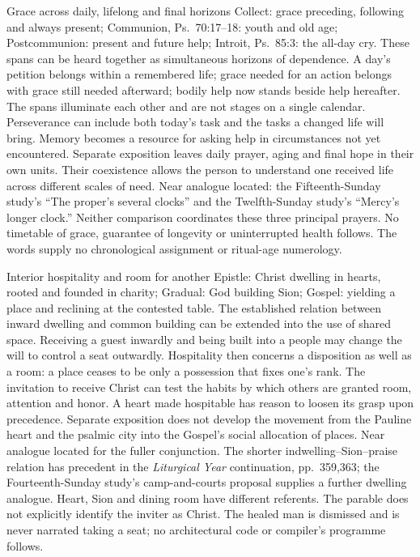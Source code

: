 \begin{proposal}{Grace across daily, lifelong and final horizons}
 Collect: grace preceding, following and always present; Communion, Ps.~70:17--18: youth and old age; Postcommunion: present and future help; Introit, Ps.~85:3: the all-day cry.
 These spans can be heard together as simultaneous horizons of dependence. A day's petition belongs within a remembered life; grace needed for an action belongs with grace still needed afterward; bodily help now stands beside help hereafter. The spans illuminate each other and are not stages on a single calendar.
 Perseverance can include both today's task and the tasks a changed life will bring. Memory becomes a resource for asking help in circumstances not yet encountered.
 Separate exposition leaves daily prayer, aging and final hope in their own units. Their coexistence allows the person to understand one received life across different scales of need.
 Near analogue located: the Fifteenth-Sunday study's ``The proper's several clocks'' and the Twelfth-Sunday study's ``Mercy's longer clock.'' Neither comparison coordinates these three principal prayers.
 No timetable of grace, guarantee of longevity or uninterrupted health follows. The words supply no chronological assignment or ritual-age numerology.
\end{proposal}

\begin{proposal}{Interior hospitality and room for another}
 Epistle: Christ dwelling in hearts, rooted and founded in charity; Gradual: God building Sion; Gospel: yielding a place and reclining at the contested table.
 The established relation between inward dwelling and common building can be extended into the use of shared space. Receiving a guest inwardly and being built into a people may change the will to control a seat outwardly. Hospitality then concerns a disposition as well as a room: a place ceases to be only a possession that fixes one's rank.
 The invitation to receive Christ can test the habits by which others are granted room, attention and honor. A heart made hospitable has reason to loosen its grasp upon precedence.
 Separate exposition does not develop the movement from the Pauline heart and the psalmic city into the Gospel's social allocation of places.
 Near analogue located for the fuller conjunction. The shorter indwelling--Sion--praise relation has precedent in the \textit{Liturgical Year} continuation, pp.~359,363; the Fourteenth-Sunday study's camp-and-courts proposal supplies a further dwelling analogue.
 Heart, Sion and dining room have different referents. The parable does not explicitly identify the inviter as Christ. The healed man is dismissed and is never narrated taking a seat; no architectural code or compiler's programme follows.
\end{proposal}

